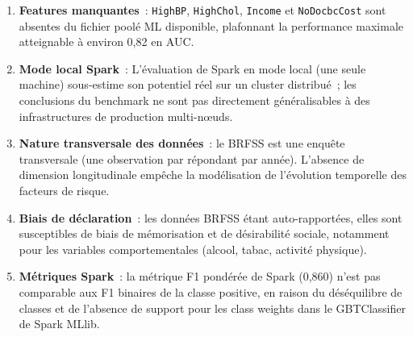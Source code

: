 \begin{enumerate}
    \item \textbf{Features manquantes}~: \texttt{HighBP}, \texttt{HighChol},
          \texttt{Income} et \texttt{NoDocbcCost} sont absentes du fichier poolé ML
          disponible, plafonnant la performance maximale atteignable à environ 0,82 en AUC.

    \item \textbf{Mode local Spark}~: L'évaluation de Spark en mode local (une seule
          machine) sous-estime son potentiel réel sur un cluster distribué~; les
          conclusions du benchmark ne sont pas directement généralisables à des
          infrastructures de production multi-nœuds.

    \item \textbf{Nature transversale des données}~: le BRFSS est une enquête
          transversale (une observation par répondant par année). L'absence de
          dimension longitudinale empêche la modélisation de l'évolution temporelle
          des facteurs de risque.

    \item \textbf{Biais de déclaration}~: les données BRFSS étant auto-rapportées,
          elles sont susceptibles de biais de mémorisation et de désirabilité
          sociale, notamment pour les variables comportementales (alcool, tabac,
          activité physique).

    \item \textbf{Métriques Spark}~: la métrique F1 pondérée de Spark (0,860) n'est
          pas comparable aux F1 binaires de la classe positive, en raison du
          déséquilibre de classes et de l'absence de support pour les class weights
          dans le GBTClassifier de Spark MLlib.
\end{enumerate}
